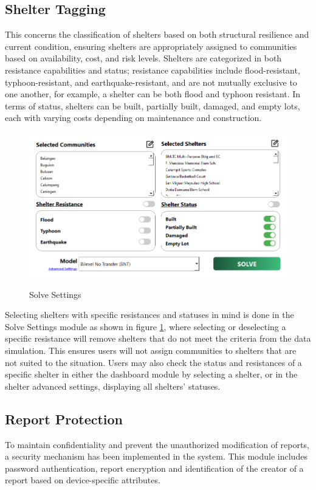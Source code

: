 \documentclass[12pt,a4paper,]{article}
\begin{document}
	\subsection{Shelter Tagging}
	This concerns the classification of shelters based on both structural resilience and current condition, ensuring shelters are appropriately assigned to communities based on availability, cost, and risk levels. Shelters are categorized in both resistance capabilities and status; resistance capabilities include flood-resistant, typhoon-resistant, and earthquake-resistant, and are not mutually exclusive to one another, for example, a shelter can be both flood and typhoon resistant. In terms of status, shelters can be built, partially built, damaged, and empty lots, each with varying costs depending on maintenance and construction.
	
	\begin{figure}[h!]
		\caption{Solve Settings}
		\centering
		\includegraphics[width=\columnwidth]{Chapter 4/solvesettings}
		\label{solveSet}
	\end{figure}
	Selecting shelters with specific resistances and statuses in mind is done in the Solve Settings module as shown in figure \ref{solveSet}, where selecting or deselecting a specific resistance will remove shelters that do not meet the criteria from the data simulation. This ensures users will not assign communities to shelters that are not suited to the situation. Users may also check the status and resistances of a specific shelter in either the dashboard module by selecting a shelter, or in the shelter advanced settings, displaying all shelters’ statuses.
	
	
	\subsection{Report Protection}
	To maintain confidentiality and prevent the unauthorized modification of reports, a security mechanism has been implemented in the system. This module includes password authentication, report encryption and identification of the creator of a report based on device-specific attributes.
	
\end{document}
